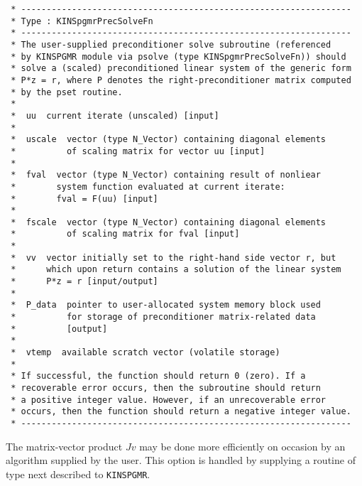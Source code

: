 \documentclass[11pt]{article}
\begin{document}
\begin{verbatim}
 * -----------------------------------------------------------------
 * Type : KINSpgmrPrecSolveFn
 * -----------------------------------------------------------------
 * The user-supplied preconditioner solve subroutine (referenced
 * by KINSPGMR module via psolve (type KINSpgmrPrecSolveFn)) should
 * solve a (scaled) preconditioned linear system of the generic form
 * P*z = r, where P denotes the right-preconditioner matrix computed
 * by the pset routine.
 *
 *  uu  current iterate (unscaled) [input]
 *
 *  uscale  vector (type N_Vector) containing diagonal elements
 *          of scaling matrix for vector uu [input]
 *
 *  fval  vector (type N_Vector) containing result of nonliear
 *        system function evaluated at current iterate:
 *        fval = F(uu) [input]
 *
 *  fscale  vector (type N_Vector) containing diagonal elements
 *          of scaling matrix for fval [input]
 *
 *  vv  vector initially set to the right-hand side vector r, but
 *      which upon return contains a solution of the linear system
 *      P*z = r [input/output]
 *
 *  P_data  pointer to user-allocated system memory block used
 *          for storage of preconditioner matrix-related data
 *          [output]
 *
 *  vtemp  available scratch vector (volatile storage)
 *
 * If successful, the function should return 0 (zero). If a
 * recoverable error occurs, then the subroutine should return
 * a positive integer value. However, if an unrecoverable error
 * occurs, then the function should return a negative integer value.
 * -----------------------------------------------------------------

\end{verbatim}
\normalsize
  
The matrix-vector product $Jv$ may be done more efficiently on
occasion by an algorithm supplied by the user. This option is handled
by supplying a routine of type next described to {\tt KINSPGMR}.
\end{document}
